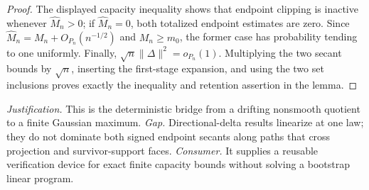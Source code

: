 \documentclass{article}
\begin{document}
\begin{proof}
The displayed capacity inequality shows that endpoint clipping is inactive whenever \(\widehat M_n>0\); if \(\widehat M_n=0\), both totalized endpoint estimates are zero. Since \(\widehat M_n=M_n+O_{P_n}(n^{-1/2})\) and \(M_n\ge m_0\), the former case has probability tending to one uniformly. Finally,
\(\sqrt n\lVert\Delta\rVert^2=o_{P_n}(1)\). Multiplying the two secant bounds by \(\sqrt n\), inserting the first-stage expansion, and using the two set inclusions proves exactly the inequality and retention assertion in the lemma.
\end{proof}
\par\smallskip\noindent \textit{Justification.} This is the deterministic bridge from a drifting nonsmooth quotient to a finite Gaussian maximum. \textit{Gap.} Directional-delta results linearize at one law; they do not dominate both signed endpoint secants along paths that cross projection and survivor-support faces. \textit{Consumer.} It supplies a reusable verification device for exact finite capacity bounds without solving a bootstrap linear program.
\end{document}
